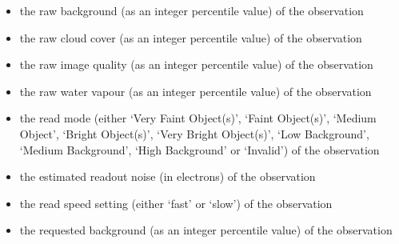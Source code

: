 \documentclass[letterpaper,10pt,english]{sphinxmanual}
\begin{document}
\begin{itemize}
\item {} 
the raw background (as an integer percentile value) of the observation

\end{itemize}

\begin{itemize}
\item {} 
the raw cloud cover (as an integer percentile value) of the observation

\end{itemize}

\begin{itemize}
\item {} 
the raw image quality (as an integer percentile value) of the observation

\end{itemize}

\begin{itemize}
\item {} 
the raw water vapour (as an integer percentile value) of the observation

\end{itemize}

\begin{itemize}
\item {} 
the read mode (either `Very Faint Object(s)', `Faint Object(s)', `Medium
Object', `Bright Object(s)', `Very Bright Object(s)', `Low Background',
`Medium Background', `High Background' or `Invalid') of the observation

\end{itemize}

\begin{itemize}
\item {} 
the estimated readout noise (in electrons) of the observation

\end{itemize}

\begin{itemize}
\item {} 
the read speed setting (either `fast' or `slow') of the observation

\end{itemize}

\begin{itemize}
\item {} 
the requested background (as an integer percentile value) of the observation

\end{itemize}
\end{document}

